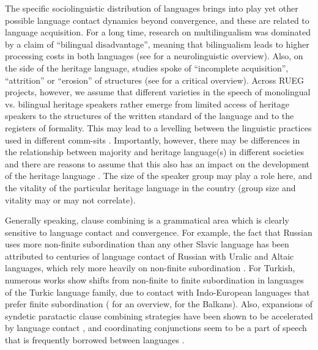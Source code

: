 \documentclass[output=paper,colorlinks,citecolor=brown]{langscibook}
\begin{document}
The specific sociolinguistic distribution of languages brings into play yet other possible language contact dynamics beyond convergence, and these are related to language acquisition. For a long time, research on multilingualism was dominated by a claim of “bilingual disadvantage”, meaning that bilingualism leads to higher processing costs in both languages (see \cite{higby2013multilingualism} for a neurolinguistic overview). Also, on the side of the heritage language, studies spoke of “incomplete acquisition”, “attrition” or “erosion” of structures (see \cite[ch. 7]{aalberse2019heritage} for a critical overview). Across RUEG projects, however, we assume that different varieties in the speech of monolingual vs. bilingual heritage speakers rather emerge from limited access of heritage speakers to the structures of the written standard of the language and to the registers of formality. This may lead to a levelling between the linguistic practices used in different comm-sits \parencite{wiese2022heritage}. Importantly, however, there may be differences in the relationship between majority and heritage language(s) in different societies and there are reasons to assume that this also has an impact on the development of the heritage language \parencite{iefremenko2021converbs}. The size of the speaker group may play a role here, and the vitality of the particular heritage language in the country (group size and vitality may or may not correlate). 

Generally speaking, clause combining is a grammatical area which is clearly sensitive to language contact and convergence. For example, the fact that Russian uses more non-finite subordination than any other Slavic language has been attributed to centuries of language contact of Russian with Uralic and Altaic languages, which rely more heavily on non-finite subordination \parencite[772]{grenoble2013syntax}. For Turkish, numerous works show shifts from non-finite to finite subordination in languages of the Turkic language family, due to contact with Indo-European languages that prefer finite subordination (\cite[566]{johanson2020turkic} for an overview,
\cite{keskin2023transient, chapters/09} for the Balkans). Also, expansions of syndetic paratactic clause combining strategies have been shown to be accelerated by language contact \parencite{mithun1988}, and coordinating conjunctions seem to be a part of speech that is frequently borrowed between languages \parencite{winford2003introduction}.
\end{document}
